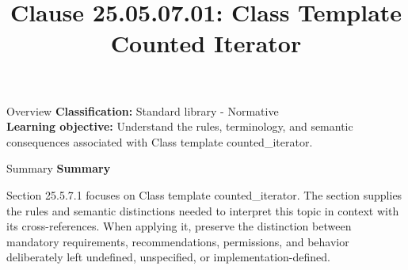 \documentclass[10pt,letterpaper]{article}
\title{Clause 25.05.07.01: Class Template Counted Iterator}
\author{}
\date{}
\begin{document}
\maketitle
\begin{CornellOverviewBox}{Overview}
\textbf{Classification:} Standard library - Normative\\[2pt]
\textbf{Learning objective:} Understand the rules, terminology, and semantic consequences associated with Class template counted\_iterator.
\end{CornellOverviewBox}\begin{CornellSummaryBox}{Summary}
{\sffamily\bfseries\color{Accent} Summary}\par\vspace{3pt}Section 25.5.7.1 focuses on Class template counted\_iterator. The section supplies the rules and semantic distinctions needed to interpret this topic in context with its cross-references. When applying it, preserve the distinction between mandatory requirements, recommendations, permissions, and behavior deliberately left undefined, unspecified, or implementation-defined.
\end{CornellSummaryBox}
\end{document}
